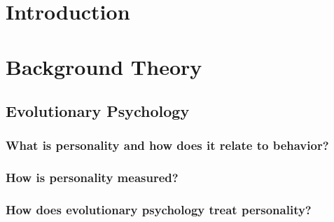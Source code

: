 \documentclass[a4paper]{article}
\begin{document}
% 	


\mbox{}
\thispagestyle{empty}
\newpage
\setcounter{secnumdepth}{4}


\section{Introduction \label{sec:theoryIntroduction}}
\thispagestyle{plain}

\newpage 


\section{Background Theory \label{sec:backgroundTheory}}

\thispagestyle{plain}

	\subsection{Evolutionary Psychology \label{subsec:evolutionaryPsychology}}
	

		\subsubsection{What is personality and how does it relate to behavior? \label{subsubsec:behaviorAndPersonality}}
		

		\subsubsection{How is personality measured? \label{subsubsec:dimensionsOfPersonality}}
		

		\subsubsection{How does evolutionary psychology treat personality? \label{subsubsec:individualDifferencesAndPersonality}}
		
\end{document}
